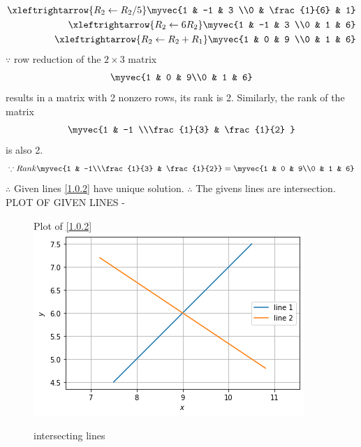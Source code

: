 \documentclass[journal,12pt,twocolumn]{IEEEtran}
\begin{document}
\begin{enumerate}
\begin{align}
\\
\xleftrightarrow {R_2\leftarrow R_2/5}\myvec{1 & -1 & 3 \\0 & \frac{1}{6} & 1}
\\
\xleftrightarrow {R_2\leftarrow 6R_2}\myvec{1 & -1 & 3 \\0 & 1 & 6}
\\
\xleftrightarrow {R_2\leftarrow R_2+R_1}\myvec{1 & 0 & 9 \\0 & 1 & 6}
\end{align}
%
$\because$ row reduction of the $2\times 3$ matrix
%
\begin{align}
\myvec{1 & 0 & 9\\0 & 1 & 6}
\end{align}
%
results in a matrix with 2 nonzero rows, its rank is 2. 
%
Similarly, the rank of the matrix 
\begin{align}
\myvec{1 & -1 \\\frac{1}{3} & \frac{1}{2} } 
\end{align}
%
is also 2.
%
\begin{align}
\because Rank \myvec{1 & -1\\\frac{1}{3} & \frac{1}{2}} &=\myvec{1 & 0 & 9\\0 & 1 & 6}\nonumber\\
\end{align}
$\therefore$ Given lines \eqref{1.0.2} have unique solution.
$\therefore$ The givens lines are intersection. 
PLOT OF GIVEN LINES -
\begin{figure}[!ht]
Plot of \eqref{1.0.2} 
    \centering
   \includegraphics[width=\columnwidth]{figure2.png}
    \caption{intersecting lines}
    \label{fig: intersecting lines.}
\end{figure}    
\end{enumerate}
\end{document}
